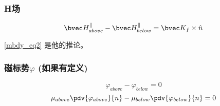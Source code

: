 \subsubsection{H场}
\begin{equation}
\bvec H^\parallel_{above} - \bvec H^\parallel_{below} = \bvec K_f \times \hat n 
\end{equation}

\autoref{mbdy_eq2}  是他的推论。


\subsubsection{磁标势$\varphi$ (如果有定义)}
\begin{equation}
\varphi_{above}-\varphi_{below}=0
\end{equation}
\begin{equation}
\mu_{above}\pdv{\varphi_{above}}{n} - \mu_{below}\pdv{\varphi_{below}}{n}  = 0
\end{equation}
